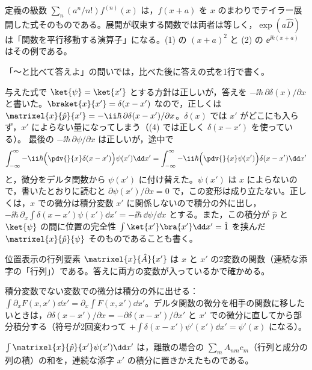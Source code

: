 \begin{rikai}
  \item 定義の級数 $\sum_{n}(a^{n}/n!)f^{(n)}(x)$ は，$f(x+a)$ を $x$ のまわりでテイラー展開した式そのものである。展開が収束する関数では両者は等しく，$\exp(a\hat{D})$ は「関数を平行移動する演算子」になる。(1) の $(x+a)^{2}$ と (2) の $\ee^{\ii k(x+a)}$ はその例である。
  \item 「〜と比べて答えよ」の問いでは，比べた後に答えの式を1行で書く。
\end{rikai}
\begin{kotaeran}
   与えた式で $\ket{\psi}=\ket{x'}$ とする方針は正しいが，答えを $-\ii\hbar\,\partial\delta(x)/\partial x$ と書いた。$\braket{x}{x'}=\delta(x-x')$ なので，正しくは $\matrixel{x}{\hat{p}}{x'}=-\ii\hbar\,\partial\delta(x-x')/\partial x$。$\delta(x)$ では $x'$ がどこにも入らず，$x'$ によらない量になってしまう（(4) では正しく $\delta(x-x')$ を使っている）。
   最後の $-\ii\hbar\,\partial\psi/\partial x$ は正しいが，途中で
  \[ \int_{-\infty}^{\infty}-\ii\hbar\Bigl(\pdv{}{x}\delta(x-x')\Bigr)\psi(x')\dd x'=\int_{-\infty}^{\infty}-\ii\hbar\Bigl(\pdv{}{x}\psi(x')\Bigr)\delta(x-x')\dd x' \]
  と，微分をデルタ関数から $\psi(x')$ に付け替えた。$\psi(x')$ は $x$ によらないので，書いたとおりに読むと $\partial\psi(x')/\partial x=0$ で，この変形は成り立たない。正しくは，$x$ での微分は積分変数 $x'$ に関係しないので積分の外に出し，$-\ii\hbar\,\partial_{x}\int\delta(x-x')\psi(x')\dd x'=-\ii\hbar\,\dd\psi/\dd x$ とする。また，この積分が $\hat{p}$ と $\ket{\psi}$ の間に位置の完全性 $\int\ket{x'}\bra{x'}\dd x'=\hat{1}$ を挟んだ $\matrixel{x}{\hat{p}}{\psi}$ そのものであることも書く。
\end{kotaeran}
\begin{rikai}
  \item 位置表示の行列要素 $\matrixel{x}{\hat{A}}{x'}$ は $x$ と $x'$ の2変数の関数（連続な添字の「行列」）である。答えに両方の変数が入っているかで確かめる。
  \item 積分変数でない変数での微分は積分の外に出せる：$\int\partial_{x}F(x,x')\dd x'=\partial_{x}\int F(x,x')\dd x'$。デルタ関数の微分を相手の関数に移したいときは，$\partial\delta(x-x')/\partial x=-\partial\delta(x-x')/\partial x'$ と $x'$ での微分に直してから部分積分する（符号が2回変わって $+\int\delta(x-x')\psi'(x')\dd x'=\psi'(x)$ になる）。
  \item $\int\matrixel{x}{\hat{p}}{x'}\psi(x')\dd x'$ は，離散の場合の $\sum_{m}A_{nm}c_{m}$（行列と成分の列の積）の和を，連続な添字 $x'$ の積分に置きかえたものである。
\end{rikai}
